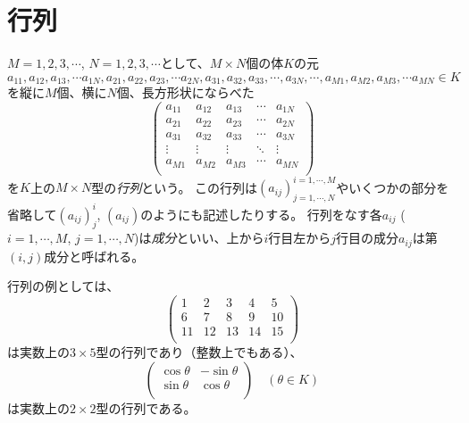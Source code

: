 \section{行列}

$M = 1, 2, 3, \cdots$, $N = 1, 2, 3, \cdots$として、$M\times N$個の体$K$の元
$$
a_{1 1}, a_{1 2}, a_{1 3}, \cdots a_{1 N}, a_{2 1}, a_{2 2}, a_{2 3}, \cdots a_{2 N}, a_{3 1}, a_{3 2}, a_{3 3}, \cdots, a_{3 N}, \cdots, a_{M 1}, a_{M 2}, a_{M 3}, \cdots a_{M N} \in K
$$
を縦に$M$個、横に$N$個、長方形状にならべた
$$
\begin{pmatrix}
a_{1 1} & a_{1 2} & a_{1 3} & \cdots & a_{1 N} \\
a_{2 1} & a_{2 2} & a_{2 3} & \cdots & a_{2 N} \\
a_{3 1} & a_{3 2} & a_{3 3} & \cdots & a_{3 N} \\
\vdots & \vdots & \vdots & \ddots & \vdots \\
a_{M 1} & a_{M 2} & a_{M 3} & \cdots & a_{M N} \\
\end{pmatrix}
$$
を$K$上の$M\times N$型の\emph{行列}という。
この行列は$(a_{i j})^{i = 1, \cdots, M}_{j = 1, \cdots, N}$やいくつかの部分を省略して$(a_{i j})^i_j$, $(a_{i j})$のようにも記述したりする。
行列をなす各$a_{i j}$ ($i = 1, \cdots, M$, $j = 1, \cdots, N$)は\emph{成分}といい、上から$i$行目左から$j$行目の成分$a_{i j}$は第$(i, j)$成分と呼ばれる。

行列の例としては、
$$
\begin{pmatrix}
1 & 2 & 3 & 4 & 5 \\
6 & 7 & 8 & 9 & 10 \\
11 & 12 & 13 & 14 & 15 \\
\end{pmatrix}
$$
は実数上の$3\times 5$型の行列であり（整数上でもある）、
$$
\begin{pmatrix}
\cos\theta & -\sin\theta \\
\sin\theta & \cos\theta \\
\end{pmatrix}
\quad (\theta \in K)
$$
は実数上の$2\times 2$型の行列である。


